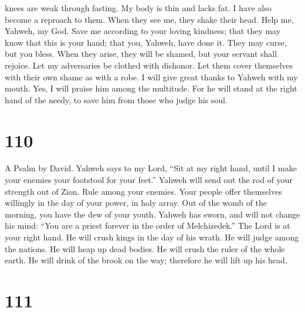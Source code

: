 knees are weak through fasting. My body is thin and lacks fat.
 I have also become a reproach to them. When they see me,
they shake their head.  Help me, Yahweh, my God. Save me
according to your loving kindness;  that they may know that
this is your hand; that you, Yahweh, have done it.  They
may curse, but you bless. When they arise, they will be shamed, but your
servant shall rejoice.  Let my adversaries be clothed with
dishonor. Let them cover themselves with their own shame as with a robe.
 I will give great thanks to Yahweh with my mouth. Yes, I
will praise him among the multitude.  For he will stand at
the right hand of the needy, to save him from those who judge his soul.

\hypertarget{section-100}{%
\section{110}\label{section-100}}

A Psalm by David.  Yahweh says to my Lord, ``Sit at my right
hand, until I make your enemies your footstool for your feet.''
 Yahweh will send out the rod of your strength out of Zion.
Rule among your enemies.  Your people offer themselves
willingly in the day of your power, in holy array. Out of the womb of
the morning, you have the dew of your youth.  Yahweh has
sworn, and will not change his mind: ``You are a priest forever in the
order of Melchizedek.''  The Lord is at your right hand. He
will crush kings in the day of his wrath.  He will judge
among the nations. He will heap up dead bodies. He will crush the ruler
of the whole earth.  He will drink of the brook on the way;
therefore he will lift up his head.

\hypertarget{section-101}{%
\section{111}\label{section-101}}


